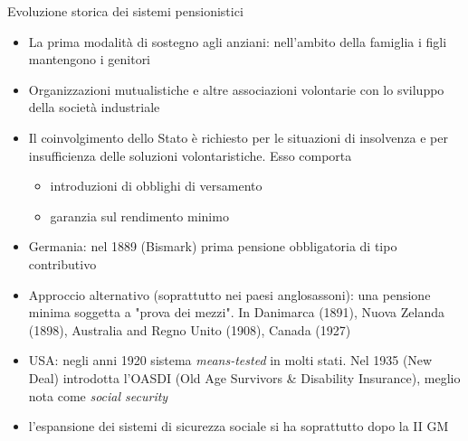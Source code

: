 \documentclass[11pt]{beamer}
\begin{document}
\begin{frame}{Evoluzione storica dei sistemi pensionistici}
\begin{itemize}
\item La prima modalità di sostegno agli anziani: nell'ambito della famiglia i
figli mantengono i genitori
\item Organizzazioni mutualistiche e altre associazioni volontarie con lo sviluppo
della società industriale
\item Il coinvolgimento dello Stato è richiesto per le situazioni di insolvenza e
per insufficienza delle soluzioni volontaristiche. Esso comporta
\begin{itemize}
\item introduzioni di obblighi di versamento
\item garanzia sul rendimento minimo
\end{itemize}
\item Germania: nel 1889 (Bismark) prima pensione obbligatoria di tipo
contributivo
\item Approccio alternativo (soprattutto nei paesi anglosassoni): una pensione
minima soggetta a "prova dei mezzi". In Danimarca (1891), Nuova Zelanda
(1898), Australia and Regno Unito (1908), Canada (1927)
\item USA: negli anni 1920 sistema \emph{means-tested} in molti stati. Nel 1935 (New
Deal) introdotta l'OASDI (Old Age Survivors \& Disability Insurance), meglio
nota come \emph{social security}
\item l'espansione dei sistemi di sicurezza sociale si ha soprattutto dopo la II
GM
\end{itemize}
\end{frame}
\end{document}
